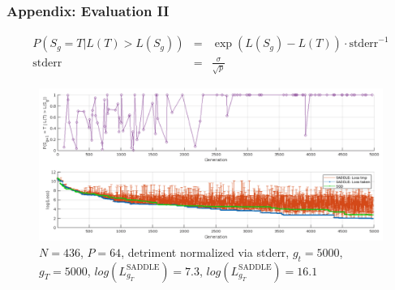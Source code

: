 \documentclass[xcolor=dvipsnames,envcountsect]{beamer}
\newcommand{\backupend}{
   \addtocounter{framenumberappendix}{-\value{framenumber}}
   \addtocounter{framenumber}{\value{framenumberappendix}} 
}
\begin{document}
\begin{frame}\frametitle{Appendix: Evaluation II}
\begin{eqnarray}
P(S_g = T | L(T) > L(S_g)) &=& \exp{(L(S_g) - L(T)) \cdot \text{stderr}^{-1}} \\
\text{stderr}&=&\frac{\sigma}{\sqrt{p}}
\end{eqnarray}	
\begin{figure}
    \includegraphics[width=.7\textwidth]{plankton_p64_gt5k_gT5k_eps001_Pc}
    \caption{$N = 436$, $P = 64$, detriment normalized via stderr, $g_t = 5000$, $g_T = 5000$, $log(L^{\text{SADDLE}}_{g_T}) = 7.3$, $log(L^{\text{SADDLE}}_{g_T}) = 16.1$}
\end{figure}
\end{frame}
\backupend

\end{document}
